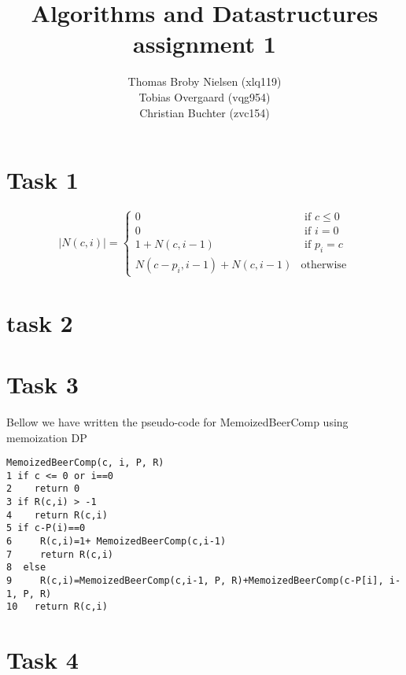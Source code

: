 \documentclass[12pt]{article}
\title{Algorithms and Datastructures assignment 1}
\author{Thomas Broby Nielsen (xlq119)\\ Tobias Overgaard (vqg954)\\ Christian Buchter (zvc154)}
\begin{document}
\maketitle

\tableofcontents

\pagebreak
\section{Task 1}
$$
|N(c,i)| = \left\{ \begin{array}{rl}
0 &\mbox{ if $c \leq 0$} \\
0 &\mbox{ if $i=0$} \\
1+N(c,i-1) &\mbox{ if $p_i=c$}\\
N(c-p_i,i-1)+N(c,i-1) &\mbox{otherwise}
\end{array} \right.
$$

\newpage
\section{task 2}

\newpage
\section{Task 3}
Bellow we have written the pseudo-code for MemoizedBeerComp using memoization DP\\

\begin{verbatim}
MemoizedBeerComp(c, i, P, R)
1 if c <= 0 or i==0
2    return 0
3 if R(c,i) > -1
4    return R(c,i)
5 if c-P(i)==0
6     R(c,i)=1+ MemoizedBeerComp(c,i-1)
7     return R(c,i)
8  else
9     R(c,i)=MemoizedBeerComp(c,i-1, P, R)+MemoizedBeerComp(c-P[i], i-1, P, R)
10   return R(c,i)
\end{verbatim}
\section{Task 4}





\end{document}
